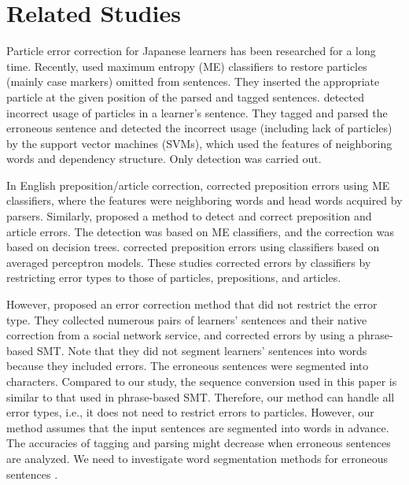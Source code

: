 \documentclass[english]{jnlp_1.4_rep}
\begin{document}
\section{Related Studies}
\label{sec-related-work}

Particle error correction for Japanese learners has been researched
for a long time. Recently, 
used maximum entropy (ME) classifiers to restore particles (mainly
case markers) omitted from sentences. They inserted the appropriate
particle at the given position of the parsed and tagged
sentences.  detected incorrect
usage of particles in a learner's sentence. They tagged and parsed the
erroneous sentence and detected the incorrect usage (including lack of
particles) by the support vector machines (SVMs), which used the
features of neighboring words and dependency structure. Only detection
was carried out.


In English preposition/article correction, 
corrected preposition errors using ME classifiers, where the features
were neighboring words and head words acquired by parsers. Similarly,
 proposed a method to detect and
correct preposition and article errors. The detection was based on ME
classifiers, and the correction was based on decision
trees.  corrected preposition
errors using classifiers based on averaged perceptron models. These
studies corrected errors by classifiers by restricting error types to
those of particles, prepositions, and articles.


However,  proposed an error
correction method that did not restrict the error type. They collected
numerous pairs of learners' sentences and their native correction from
a social network service, and corrected errors by using a phrase-based
SMT. Note that they did not segment learners' sentences into words
because they included errors. The erroneous sentences were segmented
into characters. Compared to our study, the sequence conversion used
in this paper is similar to that used in phrase-based SMT. Therefore,
our method can handle all error types, i.e., it does not need to
restrict errors to particles. However, our method assumes that the
input sentences are segmented into words in advance. The accuracies of
tagging and parsing might decrease when erroneous sentences are
analyzed. We need to investigate word segmentation methods for
erroneous sentences \cite{Fujino:ErrorMorphAnalysis2012j}.
\end{document}
